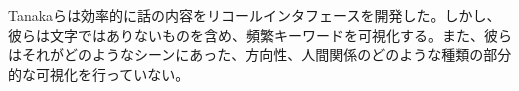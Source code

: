 \documentclass[shuuron]{kuee}
\begin{document}
  Tanakaら\cite{tanaka}は効率的に話の内容をリコールインタフェースを開発した。しかし、彼らは文字ではありないものを含め、頻繁キーワードを可視化する。また、彼らはそれがどのようなシーンにあった、方向性、人間関係のどのような種類の部分的な可視化を行っていない。

%
\end{document}
